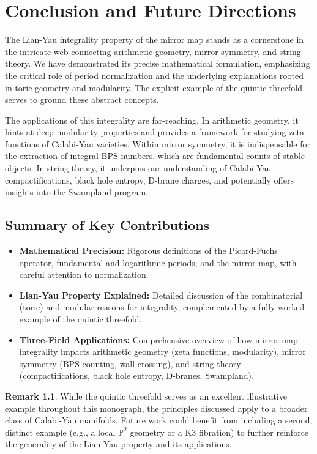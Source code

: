 \documentclass{book}
\theoremstyle{definition}
\newtheorem{remark}[theorem]{Remark}
\begin{document}
\chapter{Conclusion and Future Directions}
\label{chap:conclusion}

The Lian-Yau integrality property of the mirror map stands as a cornerstone in the intricate web connecting arithmetic geometry, mirror symmetry, and string theory. We have demonstrated its precise mathematical formulation, emphasizing the critical role of period normalization and the underlying explanations rooted in toric geometry and modularity. The explicit example of the quintic threefold serves to ground these abstract concepts.

The applications of this integrality are far-reaching. In arithmetic geometry, it hints at deep modularity properties and provides a framework for studying zeta functions of Calabi-Yau varieties. Within mirror symmetry, it is indispensable for the extraction of integral BPS numbers, which are fundamental counts of stable objects. In string theory, it underpins our understanding of Calabi-Yau compactifications, black hole entropy, D-brane charges, and potentially offers insights into the Swampland program.

\section{Summary of Key Contributions}
\begin{itemize}
    \item \textbf{Mathematical Precision:} Rigorous definitions of the Picard-Fuchs operator, fundamental and logarithmic periods, and the mirror map, with careful attention to normalization.
    \item \textbf{Lian-Yau Property Explained:} Detailed discussion of the combinatorial (toric) and modular reasons for integrality, complemented by a fully worked example of the quintic threefold.
    \item \textbf{Three-Field Applications:} Comprehensive overview of how mirror map integrality impacts arithmetic geometry (zeta functions, modularity), mirror symmetry (BPS counting, wall-crossing), and string theory (compactifications, black hole entropy, D-branes, Swampland).
\end{itemize}

\begin{remark}
While the quintic threefold serves as an excellent illustrative example throughout this monograph, the principles discussed apply to a broader class of Calabi-Yau manifolds. Future work could benefit from including a second, distinct example (e.g., a local $\mathbb{P}^2$ geometry or a K3 fibration) to further reinforce the generality of the Lian-Yau property and its applications.
\end{remark}
\end{document}
